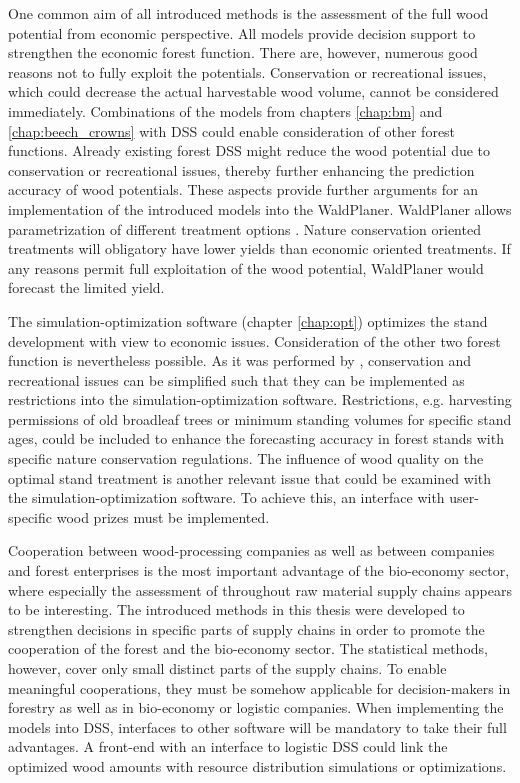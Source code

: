 One common aim of all introduced methods is the assessment of the full wood potential from economic perspective. All models provide decision support to strengthen the economic forest function. There are, however, numerous good reasons not to fully exploit the potentials. Conservation or recreational issues, which could decrease the actual harvestable wood volume, cannot be considered immediately. Combinations of the models from chapters \ref{chap:bm} and \ref{chap:beech_crowns} with DSS could enable consideration of other forest functions. Already existing forest DSS might reduce the wood potential due to conservation or recreational issues, thereby further enhancing the prediction accuracy of wood potentials. These aspects provide further arguments for an implementation of the introduced models into the WaldPlaner. WaldPlaner allows parametrization of different treatment options \citep[p. 90-93]{hansen_2014}. Nature conservation oriented treatments will obligatory have lower yields than economic oriented treatments. If any reasons permit full exploitation of the wood potential, WaldPlaner would forecast the limited yield.

The simulation-optimization software (chapter \ref{chap:opt}) optimizes the stand development with view to economic issues. Consideration of the other two forest function is nevertheless possible. As it was performed by \citet{yousefpour_2009}, conservation and recreational issues can be simplified such that they can be implemented as restrictions into the simulation-optimization software. Restrictions, e.g. harvesting permissions of old broadleaf trees or minimum standing volumes for specific stand ages, could be included to enhance the forecasting accuracy in forest stands with specific nature conservation regulations. The influence of wood quality on the optimal stand treatment is another relevant issue that could be examined with the simulation-optimization software. To achieve this, an interface with user-specific wood prizes must be implemented.

Cooperation between wood-processing companies as well as between companies and forest enterprises is the most important advantage of the bio-economy sector, where especially the assessment of throughout raw material supply chains appears to be interesting. The introduced methods in this thesis were developed to strengthen decisions in specific parts of supply chains in order to promote the cooperation of the forest and the bio-economy sector. The statistical methods, however, cover only small distinct parts of the supply chains. To enable meaningful cooperations, they must be somehow applicable for decision-makers in forestry as well as in bio-economy or logistic companies. When implementing the models into DSS, interfaces to other software will be mandatory to take their full advantages. A front-end with an interface to logistic DSS could link the optimized wood amounts with resource distribution simulations or optimizations.